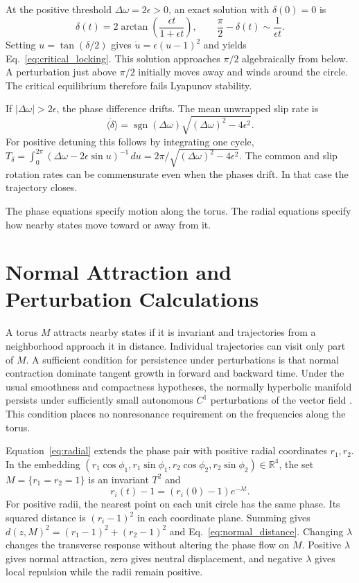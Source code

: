 \documentclass[12pt,a4paper]{article}
\begin{document}
At the positive threshold $\Delta\omega=2\epsilon>0$, an exact solution with $\delta(0)=0$ is
\begin{equation}\label{eq:critical_locking}
 \delta(t)=2\arctan\!\left(\frac{\epsilon t}{1+\epsilon t}\right),
 \qquad \frac{\pi}{2}-\delta(t)\sim\frac{1}{\epsilon t}.
\end{equation}
Setting $u=\tan(\delta/2)$ gives $\dot u=\epsilon(u-1)^2$ and yields Eq.~\eqref{eq:critical_locking}. This solution approaches $\pi/2$ algebraically from below. A perturbation just above $\pi/2$ initially moves away and winds around the circle. The critical equilibrium therefore fails Lyapunov stability.

If $|\Delta\omega|>2\epsilon$, the phase difference drifts. The mean unwrapped slip rate is
\begin{equation}\label{eq:slip}
 \langle\dot\delta\rangle=\operatorname{sgn}(\Delta\omega)
 \sqrt{(\Delta\omega)^2-4\epsilon^2}.
\end{equation}
For positive detuning this follows by integrating one cycle,
$T_\delta=\int_0^{2\pi}(\Delta\omega-2\epsilon\sin u)^{-1}\,du
=2\pi/\sqrt{(\Delta\omega)^2-4\epsilon^2}$.
The common and slip rotation rates can be commensurate even when the phases drift. In that case the trajectory closes.

The phase equations specify motion along the torus. The radial equations specify how nearby states move toward or away from it.

\section{Normal Attraction and Perturbation Calculations}\label{app:normal}\label{sec:kam}

A torus $M$ attracts nearby states if it is invariant and trajectories from a neighborhood approach it in distance. Individual trajectories can visit only part of $M$. A sufficient condition for persistence under perturbations is that normal contraction dominate tangent growth in forward and backward time. Under the usual smoothness and compactness hypotheses, the normally hyperbolic manifold persists under sufficiently small autonomous $C^1$ perturbations of the vector field \cite{BergerBounemoura2013}. This condition places no nonresonance requirement on the frequencies along the torus.

Equation~\eqref{eq:radial} extends the phase pair with positive radial coordinates $r_1,r_2$.
In the embedding $(r_1\cos\phi_1,r_1\sin\phi_1,r_2\cos\phi_2,r_2\sin\phi_2)\in\mathbb{R}^4$, the set $M=\{r_1=r_2=1\}$ is an invariant $T^2$ and
\begin{equation}
 r_i(t)-1=(r_i(0)-1)e^{-\lambda t}.
\end{equation}
For positive radii, the nearest point on each unit circle has the same phase. Its squared distance is $(r_i-1)^2$ in each coordinate plane. Summing gives $d(z,M)^2=(r_1-1)^2+(r_2-1)^2$ and Eq.~\eqref{eq:normal_distance}.
Changing $\lambda$ changes the transverse response without altering the phase flow on $M$. Positive $\lambda$ gives normal attraction, zero gives neutral displacement, and negative $\lambda$ gives local repulsion while the radii remain positive.
\end{document}
